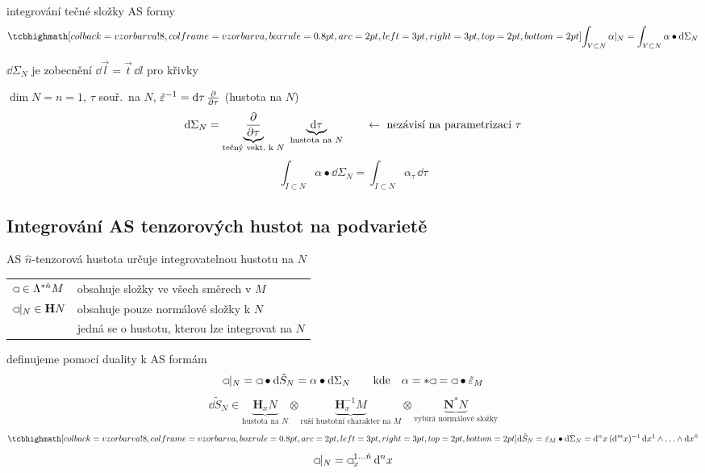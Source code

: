 \begin{minipage}{0.6\textwidth}
integrování tečné složky AS formy
\[
  \vzorec{\int_{V\subset N}\alpha|_N = \int_{V\subset N}\alpha\bullet\dd\Sigma_N}
\]
\end{minipage}
\begin{minipage}{0.38\textwidth}
\end{minipage}

\begin{priklad}[Př.]
$\dd\Sigma_N$ je zobecnění $\dd\vec l = \vec t\,\dd l$ pro křivky

$\dim N = n = 1$, \quad $\tau$ souř.\ na $N$, \quad
$\tilde\varepsilon^{-1} = \dd\tau\,\pdv{\tau}$ \quad (hustota na $N$)
\[
  \dd\Sigma_N = \underbrace{\pdv{\tau}}_{\text{tečný vekt.\ k }N}\ \underbrace{\dd\tau}_{\text{hustota na }N}
  \qquad\leftarrow\ \text{nezávisí na parametrizaci }\tau
\]
\[
  \int_{I\subset N}\alpha\bullet\dd\Sigma_N = \int_{I\subset N}\alpha_\tau\,\dd\tau
\]
\end{priklad}

\subsection{Integrování AS tenzorových hustot na podvarietě}

AS $\hat n$-tenzorová hustota určuje integrovatelnou hustotu na $N$

\begin{tabular}{@{}ll}
$\gmIpatnactHust\in\Lambda^{*\hat n}M$ & obsahuje složky ve všech směrech v $M$ \\
$\gmIpatnactHust|_N\in\mathbf{H}N$ & obsahuje pouze normálové složky k $N$ \\
 & jedná se o hustotu, kterou lze integrovat na $N$
\end{tabular}

definujeme pomocí duality k AS formám
\[
  \gmIpatnactHust|_N = \gmIpatnactHust\bullet\dd\tilde S_N = \alpha\bullet\dd\Sigma_N
  \qquad\text{kde}\quad \alpha = {*}\gmIpatnactHust = \gmIpatnactHust\bullet\tilde\varepsilon_M
\]
\[
  \dd\tilde S_N\in
  \underbrace{\mathbf{H}_xN}_{\text{hustota na }N}\otimes
  \underbrace{\mathbf{H}^{-1}_xM}_{\text{ruší hustotní charakter na }M}\otimes
  \underbrace{\mathbf{N}^*N}_{\text{vybírá normálové složky}}
\]
\[
  \vzorec{\dd\tilde S_N = \tilde\varepsilon_M\bullet\dd\Sigma_N}
  = \dd^n x\,(\dd^m x)^{-1}\,\dd x^1\wedge\ldots\wedge\dd x^{\hat n}
\]
\[
  \gmIpatnactHust|_N = \gmIpatnactHust_x^{1\ldots\hat n}\,\dd^n x
\]

